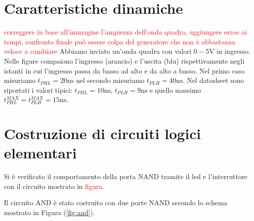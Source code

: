 \documentclass[10pt,a4paper]{article}
\begin{document}
	\section{Caratteristiche dinamiche}
\textcolor{red}{correggere in base all'immagine l'ampiezza dell'onda quadra, aggiungere erroe ai tempi, confronto finale può essere colpa del generatore che non è abbastanza veloce a cambiare}
Abbiamo inviato un'onda quadra con valori  $0-5 \si{\volt}$ in ingresso. Nelle figure compaiono l'ingresso (arancio) e l'uscita (blu) rispettivamente negli istanti in cui l'ingresso passa da basso ad alto e da alto a basso.
Nel primo caso misuriamo $t_{PHL}= 20 \si{\nano\second}$ nel secondo  misuriamo $t_{PLH} = 40\si{\nano \second}$.
Nel datasheet sono riportati i valori tipici: $t_{PHL}= 10 \si{\nano\second}$, $t_{PLH} = 9\si{\nano \second}$ e quello massimo $t_{PHL}^{MAX}= t_{PLH}^{MAX}= 15 \si{\nano\second}$.


\section{Costruzione di circuiti logici elementari}
Si è verificato il comportamento della porta NAND tramite il led e l'interruttore con il circuito mostrato in \textcolor{red}{figura}.

Il circuito AND è stato costruito con due porte NAND secondo lo schema mostrato in Figura (\ref{fig:and}).
\end{document}
